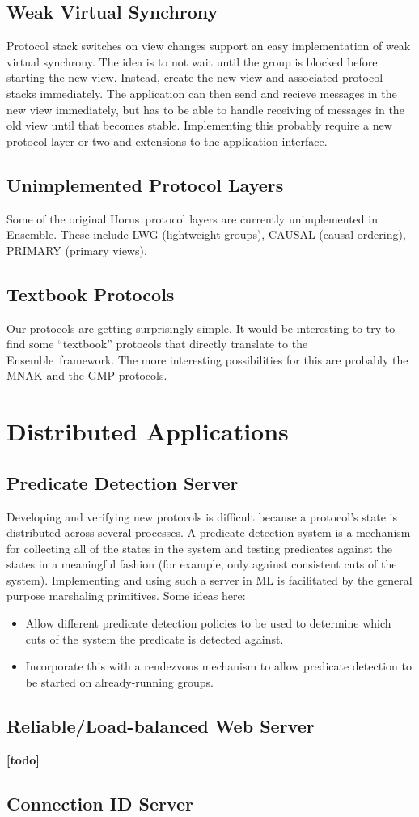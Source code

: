 \documentclass{article}
\newcommand {\note}[1]		{{\bf [#1]}}
\newcommand {\ensemble}[0]	{Ensemble}
\newcommand {\horus}[0]		{Horus}
\newcommand {\project}[1]	{\subsection{#1}}
\begin{document}
\project{Weak Virtual Synchrony}
Protocol stack switches on view changes support an easy implementation of
weak virtual synchrony.  The idea is to not wait until the group is blocked
before starting the new view.  Instead, create the new view and associated
protocol stacks immediately.  The application can then send and recieve
messages in the new view immediately, but has to be able to handle
receiving of messages in the old view until that becomes stable.
Implementing this probably require a new protocol layer or two and
extensions to the application interface.

\project{Unimplemented Protocol Layers} 

Some of the original \horus\ protocol layers are currently unimplemented in
\ensemble.  These include LWG (lightweight groups), CAUSAL (causal ordering),
PRIMARY (primary views).

\project{Textbook Protocols}
Our protocols are getting surprisingly simple.  It would be interesting to
try to find some ``textbook'' protocols that directly translate to the
\ensemble\ framework.  The more interesting possibilities for this are probably
the MNAK and the GMP protocols.

\section{Distributed Applications}

\project{Predicate Detection Server}

Developing and verifying new protocols is difficult because a protocol's
state is distributed across several processes.  A predicate detection
system is a mechanism for collecting all of the states in the system and
testing predicates against the states in a meaningful fashion (for example,
only against consistent cuts of the system).  Implementing and using such a
server in ML is facilitated by the general purpose marshaling primitives.
Some ideas here:
\begin{itemize}
\item
Allow different predicate detection policies to be used to determine which
cuts of the system the predicate is detected against.
\item
Incorporate this with a rendezvous mechanism to allow predicate detection
to be started on already-running groups.
\end{itemize}

\project{Reliable/Load-balanced Web Server}
\note{todo}

\project{Connection ID Server}
\end{document}
